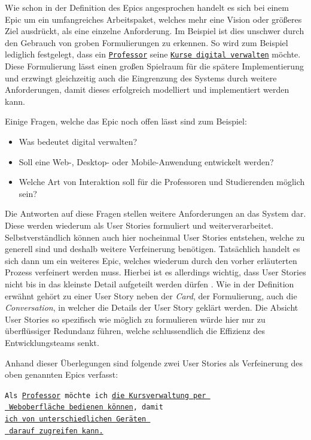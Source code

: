 \documentclass[acmtog]{acmart}
\begin{document}
Wie schon in der Definition des Epics angesprochen handelt es sich bei einem Epic um ein umfangreiches
Arbeitspaket, welches mehr eine Vision oder größeres Ziel ausdrückt, als eine einzelne Anforderung.
Im Beispiel ist dies unschwer durch den Gebrauch von groben Formulierungen zu erkennen. So wird zum
Beispiel lediglich festgelegt, dass ein \underline{\texttt{Professor}} seine \underline{\texttt{Kurse digital verwalten}}
möchte. Diese Formulierung lässt einen großen Spielraum für die spätere Implementierung und erzwingt gleichzeitig
auch die Eingrenzung des Systems durch weitere Anforderungen, damit dieses erfolgreich modelliert und implementiert werden kann.

Einige Fragen, welche das Epic noch offen lässt sind zum Beispiel:
\begin{itemize}
	\item Was bedeutet digital verwalten?
	\item Soll eine Web-, Desktop- oder Mobile-Anwendung entwickelt werden?
	\item Welche Art von Interaktion soll für die Professoren und Studierenden möglich sein?
\end{itemize}

Die Antworten auf diese Fragen stellen weitere Anforderungen an das System dar.
Diese werden wiederum als User Stories formuliert und weiterverarbeitet.
Selbstverständlich können auch hier nocheinmal User Stories entstehen, welche
zu generell sind und deshalb weitere Verfeinerung benötigen.
Tatsächlich handelt es sich dann um ein weiteres Epic, welches wiederum durch den
vorher erläuterten Prozess verfeinert werden muss.
Hierbei ist es allerdings wichtig, dass User Stories nicht bis in das kleinste Detail
aufgeteilt werden dürfen \cite[p. 6]{cohn_user_2004}.
Wie in der Definition erwähnt gehört zu einer User Story neben der \emph{Card}, der Formulierung,
auch die \emph{Conversation}, in welcher die Details der User Story geklärt werden.
Die Absicht User Stories so spezifisch wie möglich zu formulieren würde hier nur zu überflüssiger
Redundanz führen, welche schlussendlich die Effizienz des Entwicklungsteams senkt.

Anhand dieser Überlegungen sind folgende zwei User Stories als Verfeinerung des oben genannten Epics verfasst:

\vspace{1em}
\texttt{Als \underline{Professor} möchte ich \underline{die Kursverwaltung per }\\
	\hspace*{2em} \underline{ Weboberfläche bedienen können}, damit\\
	\hspace*{6em} \underline{ich von unterschiedlichen Geräten }\\
	\hspace*{14em} \underline{ darauf zugreifen kann.}}
\vspace{1em}
\end{document}
